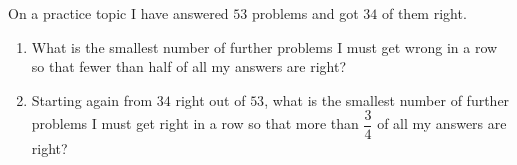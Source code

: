 On a practice topic I have answered $53$ problems and got $34$ of them right.
\begin{enumerate}
\item[(a)] What is the smallest number of further problems I must get wrong in a row so that fewer than half of all my answers are right?
\item[(b)] Starting again from $34$ right out of $53$, what is the smallest number of further problems I must get right in a row so that more than $\dfrac{3}{4}$ of all my answers are right?
\end{enumerate}
